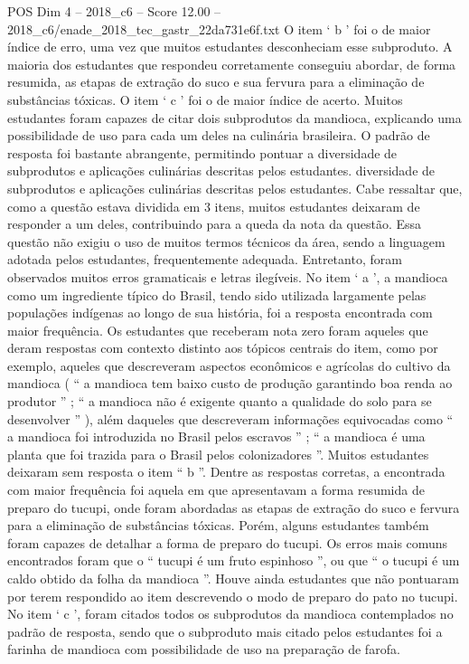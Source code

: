 \begin{textsample}{POS Dim 4 – 2018\_c6 – Score 12.00 – 2018\_c6/enade\_2018\_tec\_gastr\_22da731e6f.txt}
O item ‘ b ’ foi o de maior índice de erro, uma vez que muitos estudantes desconheciam esse subproduto.
A maioria dos estudantes que respondeu corretamente conseguiu abordar, de forma resumida, as etapas de extração do suco e sua fervura para a eliminação de substâncias tóxicas.
O item ‘ c ’ foi o de maior índice de acerto.
Muitos estudantes foram capazes de citar dois subprodutos da mandioca, explicando uma possibilidade de uso para cada um deles na culinária brasileira.
O padrão de resposta foi bastante abrangente, permitindo pontuar a diversidade de subprodutos e aplicações culinárias descritas pelos estudantes. diversidade de subprodutos e aplicações culinárias descritas pelos estudantes.
Cabe ressaltar que, como a questão estava dividida em 3 itens, muitos estudantes deixaram de responder a um deles, contribuindo para a queda da nota da questão.
Essa questão não exigiu o uso de muitos termos técnicos da área, sendo a linguagem adotada pelos estudantes, frequentemente adequada.
Entretanto, foram observados muitos erros gramaticais e letras ilegíveis.
No item ‘ a ’, a mandioca como um ingrediente típico do Brasil, tendo sido utilizada largamente pelas populações indígenas ao longo de sua história, foi a resposta encontrada com maior frequência.
Os estudantes que receberam nota zero foram aqueles que deram respostas com contexto distinto aos tópicos centrais do item, como por exemplo, aqueles que descreveram aspectos econômicos e agrícolas do cultivo da mandioca ( “ a mandioca tem baixo custo de produção garantindo boa renda ao produtor ” ; “ a mandioca não é exigente quanto a qualidade do solo para se desenvolver ” ), além daqueles que descreveram informações equivocadas como “ a mandioca foi introduzida no Brasil pelos escravos ” ; “ a mandioca é uma planta que foi trazida para o Brasil pelos colonizadores ”.
Muitos estudantes deixaram sem resposta o item “ b ”.
Dentre as respostas corretas, a encontrada com maior frequência foi aquela em que apresentavam a forma resumida de preparo do tucupi, onde foram abordadas as etapas de extração do suco e fervura para a eliminação de substâncias tóxicas.
Porém, alguns estudantes também foram capazes de detalhar a forma de preparo do tucupi.
Os erros mais comuns encontrados foram que o “ tucupi é um fruto espinhoso ”, ou que “ o tucupi é um caldo obtido da folha da mandioca ”.
Houve ainda estudantes que não pontuaram por terem respondido ao item descrevendo o modo de preparo do pato no tucupi.
No item ‘ c ’, foram citados todos os subprodutos da mandioca contemplados no padrão de resposta, sendo que o subproduto mais citado pelos estudantes foi a farinha de mandioca com possibilidade de uso na preparação de farofa.

\end{textsample}
